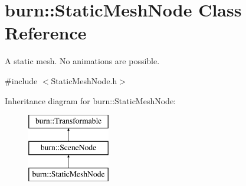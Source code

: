\hypertarget{classburn_1_1_static_mesh_node}{\section{burn\-:\-:Static\-Mesh\-Node Class Reference}
\label{classburn_1_1_static_mesh_node}
}


A static mesh. No animations are possible.  




{\ttfamily \#include $<$Static\-Mesh\-Node.\-h$>$}

Inheritance diagram for burn\-:\-:Static\-Mesh\-Node\-:\begin{figure}[H]
\begin{center}
\leavevmode
\includegraphics[height=3.000000cm]{classburn_1_1_static_mesh_node}
\end{center}
\end{figure}
